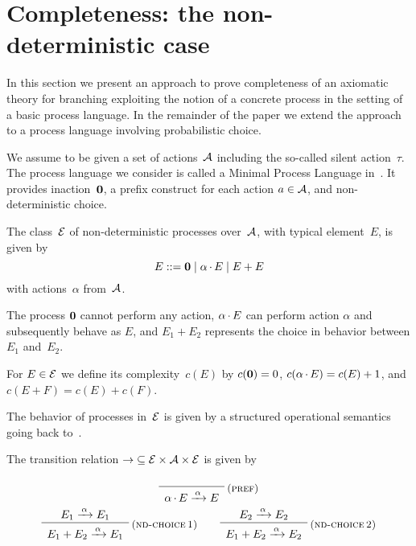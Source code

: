 

\section{Completeness: the non-deterministic case}

\label{sec-nondet}

In this section we present 
an approach to prove completeness of an axiomatic theory for branching
{\bisimilarity} exploiting the notion of a concrete process in the setting
of a basic process language. In the remainder of the paper we
extend the approach to a process language involving probabilistic choice.

\blankline

\noindent
We assume to be given a set of actions~$\mathcal{A}$ including the so-called
silent action~$\tau$. The process language we consider is called a
Minimal Process Language in~\cite{BBR10:cup}. It provides
inaction~$\normalfont{\textbf{0}}$, a prefix construct for each action $a \in \mathcal{A}$,
and non-deterministic choice.

\begin{definition}[Syntax]
  The class~$\mathcal{E}$ of non-deterministic processes over~$\mathcal{A}$, with
  typical element~$E$, is given by\vspace{-.5ex}
  \[
    E \bnfeq \bfzero \mid \alpha \pref E \mid E + E\vspace{-1.5ex}
  \]
  with actions~$\alpha$ from~$\mathcal{A}$.
\pagebreak[3]
\end{definition}

\noindent
The process $\normalfont{\textbf{0}}$ cannot perform any action, $\alpha \mathop{.} E$ can
perform action $\alpha$ and subsequently behave as $E$, and $E_1+E_2$
represents the choice in behavior between $E_1$ and~$E_2$.

For $E \in \mathcal{E}$ we define its complexity~$c(E)$ by $c(\normalfont{\textbf{0}}) = 0$,
$c(\alpha \mathop{.} E) = c(E) + 1$, and $c(E + F) = c(E) + c(F)$.

The behavior of processes in~$\mathcal{E}$ is given by a structured
operational semantics going back to~\cite{HM80:icalp}.

\begin{definition}
  \label{def-nd-transition-relation}
  The transition relation ${\rightarrow} \subseteq \mathcal{E} \times \mathcal{A}
  \times \mathcal{E}$ is
  given by
  \halflineup
  \begin{displaymath}
    \begin{array}{c}
      \sosrule{}{\alpha \pref E \arrow{\alpha} E}
      \: \textsc{\small (pref)}
     \medskip \\
      \sosrule{E_1 \arrow{\alpha} E_1}{E_1 + E_2 \arrow{\alpha} E_1}
      \: \textsc{\small (nd-choice\,1)}
      \qquad
      \sosrule{E_2 \arrow{\alpha} E_2}{E_1 + E_2 \arrow{\alpha} E_2}
      \: \textsc{\small (nd-choice\,2)}
   \end{array}
  \end{displaymath}
\end{definition}

